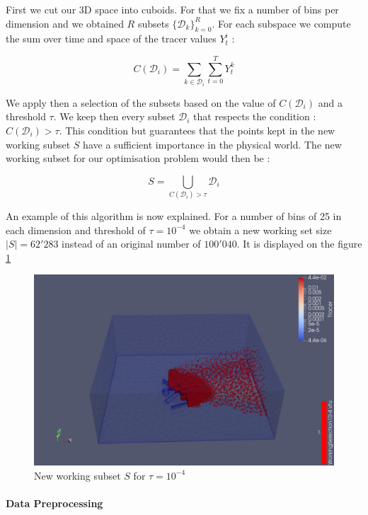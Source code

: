 First we cut our 3D space into cuboids. For that we fix a number of bins per dimension and we obtained $R$ subsets $\{\mathcal{D}_k\}_{k=0}^R $. For each subspace we compute the sum over time and space of the tracer values $Y_t^i$  : 

\begin{equation}
	C(\mathcal{D}_i) = \sum_{k \in \mathcal{D}_i} \sum_{t = 0}^T Y_t^k
\end{equation}

We apply then a selection of the subsets based on the value of $C(\mathcal{D}_i)$ and a  threshold $\tau$. We keep then every subset $\mathcal{D}_i$ that respects the condition : $C(\mathcal{D}_i) > \tau$. This condition but guarantees that the points kept in the new working subset $S$ have a sufficient importance in the physical world. The new working subset for our optimisation problem would then be : 

\begin{equation}
	S = \bigcup_{C(\mathcal{D}_i) > \tau} \mathcal{D}_i
\end{equation} 

An example of this algorithm is now explained. For a number of bins of 25 in each dimension and threshold of $\tau = 10^{-4}$ we obtain a new working set size $|S| = 62'283$ instead of an original number of $100'040$. It is displayed on the figure \ref{fig:working_subset}

\begin{figure}[t]
\centering
	\includegraphics[width = 0.8 \textwidth]{figures/Tracer/working_subset_10^-4}
	\caption{New working subset $S$ for $\tau = 10^{-4}$}
	\label{fig:working_subset}
\end{figure}

\paragraph{Data Preprocessing}


